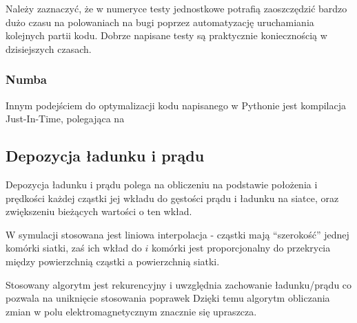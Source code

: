 Należy zaznaczyć, że w numeryce testy jednostkowe potrafią zaoszczędzić bardzo dużo czasu na polowaniach na bugi
poprzez automatyzację uruchamiania kolejnych partii kodu. Dobrze napisane testy są praktycznie koniecznością w dzisiejszych
czasach. %

\subsubsection{Numba}

Innym podejściem do optymalizacji kodu napisanego w Pythonie jest kompilacja Just-In-Time, polegająca na %

\subsection{Depozycja ładunku i prądu}

Depozycja ładunku i prądu polega na obliczeniu na podstawie położenia i prędkości każdej cząstki jej wkładu do
gęstości prądu i ładunku na siatce, oraz zwiększeniu bieżących wartości o ten wkład.

W symulacji stosowana jest liniowa interpolacja - cząstki mają ``szerokość'' jednej komórki siatki, zaś ich wkład do $i$
komórki jest proporcjonalny do przekrycia między powierzchnią cząstki a powierzchnią siatki.

Stosowany algorytm jest rekurencyjny i uwzględnia zachowanie ładunku/prądu %
co pozwala na uniknięcie stosowania poprawek %
Dzięki temu algorytm obliczania zmian w polu elektromagnetycznym znacznie się upraszcza.


